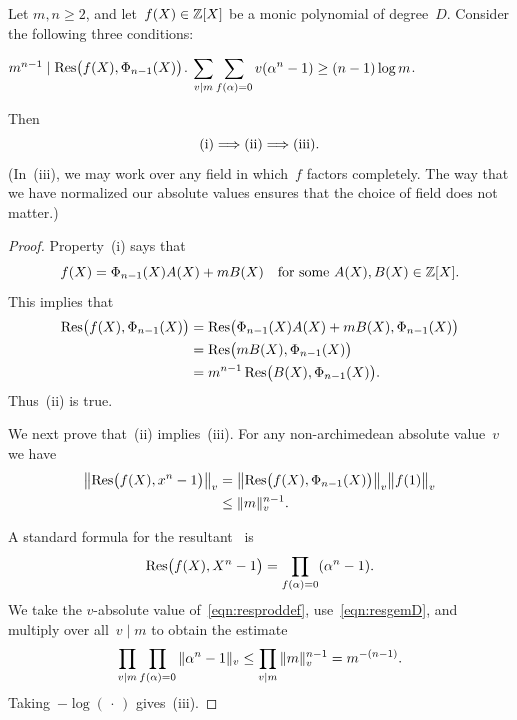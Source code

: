 \documentclass[12pt,reqno]{amsart}
\begin{document}
\begin{proposition}
\label{prop:wkmodm}
Let $m,n\ge2$, and let~$f(X)\in\mathbb{Z}[X]$ be a monic polynomial of
degree~$D$.  Consider the following three conditions\textup:
\begin{parts}
\vspace{1\jot}
  $m^{n-1} \mid \operatorname{Res}\bigl(f(X),\Phi_{n-1}(X)\bigr)$.
\vspace{1\jot}
  $\displaystyle \sum_{v\mid m} \sum_{f(\alpha)=0}
    v(\alpha^{n}-1) \ge (n-1)\log m$.
\end{parts}
Then
\[
  \textup{(i)} \Longrightarrow
  \textup{(ii)} \Longrightarrow
  \textup{(iii)}.
\]
\textup(In~\textup{(iii)}, we may work over any field in which~$f$ factors
completely. The way that we have normalized our absolute values
ensures that the choice of field does not matter.\textup) 
\end{proposition}

\begin{proof}
Property~(i) says that
\[
  f(X) = \Phi_{n-1}(X)A(X) + mB(X)
  \quad\text{for some $A(X),B(X)\in\mathbb{Z}[X]$.}
\]
This implies that
\begin{align*}
  \operatorname{Res}\bigl(f(X),\Phi_{n-1}(X)\bigr)
  &= \operatorname{Res}\bigl(\Phi_{n-1}(X)A(X) + mB(X),\Phi_{n-1}(X)\bigr)\\
  &= \operatorname{Res}\bigl(mB(X),\Phi_{n-1}(X)\bigr)\\
  &= m^{n-1} \operatorname{Res}\bigl(B(X),\Phi_{n-1}(X)\bigr).
\end{align*}
Thus~(ii) is true. 
\par
We next prove that~(ii) implies~(iii).  For any non-archimedean
absolute value~$v$ we have
\begin{align}
  \label{eqn:resgemD}
  \bigl\|\operatorname{Res}\bigl(f(X),x^{n}-1\bigr)\bigr\|_v
  &= \bigl\|\operatorname{Res}\bigl(f(X),\Phi_{n-1}(X)\bigr)\bigr\|_v
     \bigl\|f(1)\bigr\|_v  \notag\\*
  &\le \|m\|_v^{n-1}.
\end{align}
\par
A standard formula for the resultant~\cite[Section~V.10]{lang:algebra}
is
\begin{equation}
  \label{eqn:resproddef}
  \operatorname{Res}\bigl(f(X),X^{n}-1\bigr)
  = \prod_{f(\alpha)=0} (\alpha^{n}-1).
\end{equation}
We take the $v$-absolute value of~\eqref{eqn:resproddef},
use~\eqref{eqn:resgemD}, and multiply over all~$v\mid m$ to obtain the
estimate
\begin{equation}
  \label{eqnvmiDaizv}
  \prod_{v\mid m} \prod_{f(\alpha)=0} \|\alpha^{n}-1\|_v
  \le \prod_{v\mid m} \|m\|_v^{n-1} = m^{-(n-1)}.
\end{equation}
Taking~$-\log(\,\cdot\,)$ gives~(iii).  
\end{proof}
\end{document}
